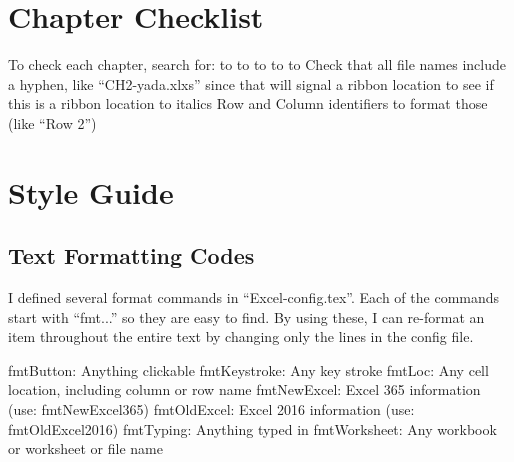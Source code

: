 \begin{enumerate}[resume]
\section{Chapter Checklist}

To check each chapter, search for:
\fmtPopupButton to \fmtButton
\fmtWorksheetName to \fmtWorksheet
\fmtWorkbookName to \fmtWorksheet
\fmtCellLocation to \fmtLoc
\fmtRibbonButton to \fmtButton
Check that all file names include a hyphen, like ``CH2-yada.xlxs''
\fmtRibbonGroup since that will signal a ribbon location
\fmtRibbonTab to see if this is a ribbon location
\fmtPopupBox to italics
Row and Column identifiers to format those (like ``Row 2'')

\section{Style Guide}

\subsection{Text Formatting Codes}
I defined several format commands in ``Excel-config.tex''. Each of the commands start with ``fmt...'' so they are easy to find. By using these, I can re-format an item throughout the entire text by changing only the lines in the config file.

fmtButton: Anything clickable 
fmtKeystroke: Any key stroke
fmtLoc: Any cell location, including column or row name
fmtNewExcel: Excel 365 information (use: fmtNewExcel{365})
fmtOldExcel: Excel 2016 information (use: fmtOldExcel{2016})
fmtTyping: Anything typed in
fmtWorksheet: Any workbook or worksheet or file name




\end{enumerate}
